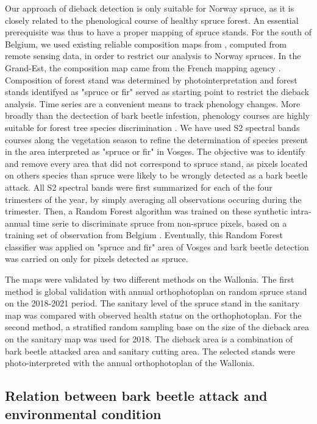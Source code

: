 \documentclass[3p,procedia]{elsarticle}
\begin{document}
Our approach of dieback detection is only suitable for Norway spruce, as it is closely related to the phenological course of healthy spruce forest.
An essential prerequisite was thus to have a proper mapping of spruce stands.
For the south of Belgium, we used existing reliable composition maps from \cite{bolyn_mapping_2022}, computed from remote sensing data, in order to restrict our analysis to Norway spruces.
In the Grand-Est, the composition map came from the French mapping agency \citep{IGN_bd_2018}. 
Composition of forest stand was determined by photointerpretation and forest stands identifyed as "spruce or fir" served as starting point to restrict the dieback analysis.
Time series are a convenient means to track phenology changes. 
More broadly than the dectection of bark beetle infestion, phenology courses are highly suitable for forest tree species discrimination \citep{lisein_discrimination_2015,grabska_forest_2019,ma_tree_2021}.
We have used S2 spectral bands courses along the vegetation season to refine the determination of species present in the area interpreted as "spruce or fir" in Vosges.
The objective was to identify and remove every area that did not correspond to spruce stand, as pixels located on others species than spruce were likely to be wrongly detected as a bark beetle attack.
All S2 spectral bands were first summarized for each of the four trimesters of the year, by simply averaging all observations occuring during the trimester.
Then, a Random Forest algorithm was trained on these synthetic intra-annual time serie to discriminate spruce from non-spruce pixels, based on a training set of observation from Belgium \citep{bolyn_forest_2018}.
Eventually, this Random Forest classifier was applied on "spruce and fir" area of Vosges and bark beetle detection was carried on only for pixels detected as spruce. 

The maps were validated by two different methods on the Wallonia.
The first method is global validation with annual orthophotoplan on random spruce stand on the 2018-2021 period. The sanitary level of the spruce stand in the sanitary map was compared with observed health status on the orthophotoplan.
For the second method, a stratified random sampling base on the size of the dieback area on the sanitary map was used for 2018.
The dieback area is a combination of bark beetle attacked area and sanitary cutting area. 
The selected stands were photo-interpreted with the annual orthophotoplan of the Wallonia.



\subsection{Relation between bark beetle attack and environmental condition}
\end{document}
